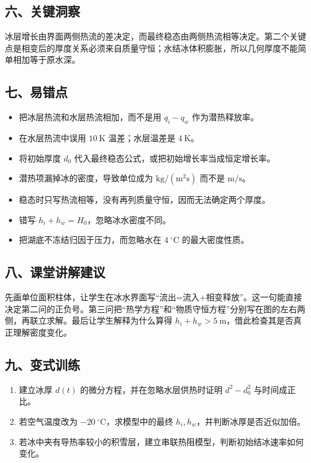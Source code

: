 \documentclass[12pt,a4paper,UTF8]{ctexart}
\newcommand{\tightlist}{\setlength{\itemsep}{0pt}\setlength{\parskip}{0pt}}
\begin{document}
\subsection{六、关键洞察}\label{ux516dux5173ux952eux6d1eux5bdf-7}

冰层增长由界面两侧热流的差决定，而最终稳态由两侧热流相等决定。第二个关键点是相变后的厚度关系必须来自质量守恒；水结冰体积膨胀，所以几何厚度不能简单相加等于原水深。

\subsection{七、易错点}\label{ux4e03ux6613ux9519ux70b9-7}

\begin{itemize}
\tightlist
\item
  把冰层热流和水层热流相加，而不是用 \(q_i-q_w\) 作为潜热释放率。
\item
  在水层热流中误用 \(10\ \mathrm K\) 温差；水层温差是 \(4\ \mathrm K\)。
\item
  将初始厚度 \(d_0\) 代入最终稳态公式，或把初始增长率当成恒定增长率。
\item
  潜热项漏掉冰的密度，导致单位成为 \(\mathrm{kg/(m^2s)}\) 而不是
  \(\mathrm{m/s}\)。
\item
  稳态时只写热流相等，没有再列质量守恒，因而无法确定两个厚度。
\item
  错写 \(h_i+h_w=H_0\)，忽略冰水密度不同。
\item
  把湖底不冻结归因于压力，而忽略水在 \(4\ ^\circ\mathrm C\)
  的最大密度性质。
\end{itemize}

\subsection{八、课堂讲解建议}\label{ux516bux8bfeux5802ux8bb2ux89e3ux5efaux8bae-7}

先画单位面积柱体，让学生在冰水界面写``流出=流入+相变释放''。这一句能直接决定第二问的正负号。第三问把``热学方程''和``物质守恒方程''分别写在图的左右两侧，再联立求解。最后让学生解释为什么算得
\(h_i+h_w>5\ \mathrm m\)，借此检查其是否真正理解密度变化。

\subsection{九、变式训练}\label{ux4e5dux53d8ux5f0fux8badux7ec3-7}

\begin{enumerate}
\def\labelenumi{\arabic{enumi}.}
\tightlist
\item
  建立冰厚 \(d(t)\) 的微分方程，并在忽略水层供热时证明 \(d^2-d_0^2\)
  与时间成正比。
\item
  若空气温度改为 \(-20\ ^\circ\mathrm C\)，求模型中的最终
  \(h_i,h_w\)，并判断冰厚是否近似加倍。
\item
  若冰中夹有导热率较小的积雪层，建立串联热阻模型，判断初始结冰速率如何变化。
\end{enumerate}
\end{document}
